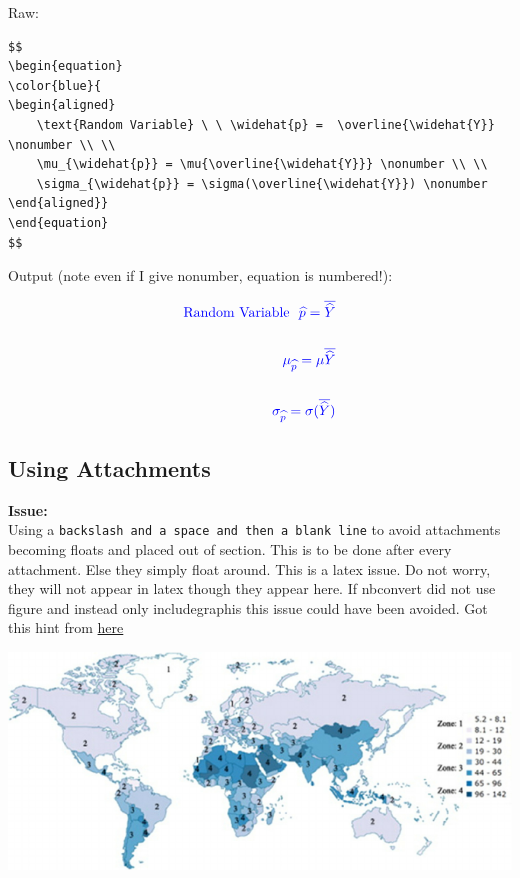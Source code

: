 \documentclass[float=false,crop=false]{standalone}
\begin{document}
Raw:

\begin{verbatim}
$$
\begin{equation}
\color{blue}{
\begin{aligned}
    \text{Random Variable} \ \ \widehat{p} =  \overline{\widehat{Y}} \nonumber \\ \\
    \mu_{\widehat{p}} = \mu{\overline{\widehat{Y}}} \nonumber \\ \\
    \sigma_{\widehat{p}} = \sigma(\overline{\widehat{Y}}) \nonumber 
\end{aligned}}
\end{equation}
$$
\end{verbatim}

Output (note even if I give nonumber, equation is numbered!):

\begin{equation}
\color{blue}{
\begin{aligned}
    \text{Random Variable} \ \ \widehat{p} =  \overline{\widehat{Y}}  \\ \\
    \mu_{\widehat{p}} = \mu{\overline{\widehat{Y}}}  \\ \\
    \sigma_{\widehat{p}} = \sigma(\overline{\widehat{Y}}) 
\end{aligned}}
\end{equation}

    \subsection{Using Attachments}\label{using-attachments}

\textbf{Issue:}\\
Using a \texttt{backslash\ and\ a\ space\ and\ then\ a\ blank\ line} to
avoid attachments becoming floats and placed out of section. This is to
be done after every attachment. Else they simply float around. This is a
latex issue. Do not worry, they will not appear in latex though they
appear here. If nbconvert did not use figure and instead only
includegraphis this issue could have been avoided. Got this hint from
\href{https://tex.stackexchange.com/questions/101725/latex-figures-appear-before-text-in-pandoc-markdown/101726}{here}

\includegraphics{ipy_sample_files/attach_4_image.png} ~
\end{document}
